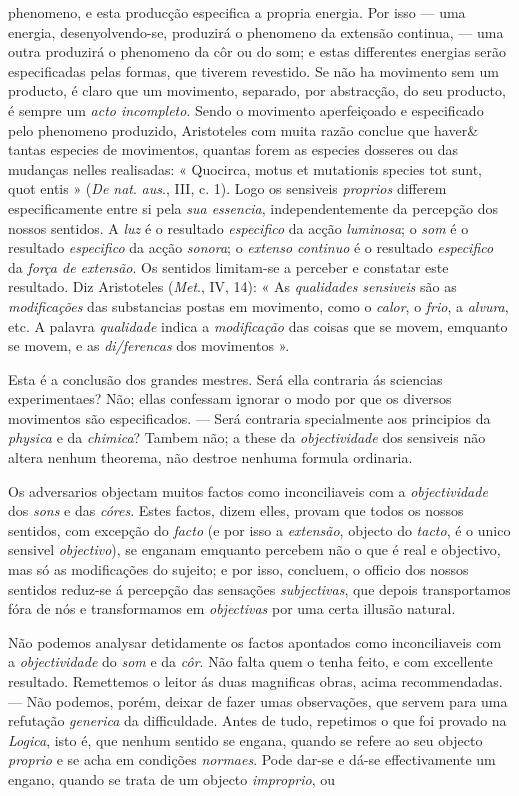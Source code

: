 phenomeno, e esta producção especifica a propria energia. Por isso --- uma energia, desenyolvendo-se, produzirá o phenomeno da extensão continua, --- uma outra produzirá o phenomeno da côr ou do som; e estas differentes energias serão especificadas pelas formas, que tiverem revestido. Se não ha movimento sem um producto, é claro que um movimento, separado, por abstracção, do seu producto, é sempre um \emph{acto incompleto}. Sendo o movimento aperfeiçoado e especificado pelo phenomeno produzido, Aristoteles com muita razão conclue que haver\& tantas especies de movimentos, quantas forem as especies dosseres ou das mudanças nelles realisadas: « Quocirca, motus et mutationis species tot sunt, quot entis » (\emph{De nat}. \emph{aus}., III, c. 1). Logo os sensiveis \emph{proprios} differem especificamente entre si pela \emph{sua essencia}, independentemente da percepção dos nossos sentidos. A \emph{luz} é o resultado \emph{especifico} da acção \emph{luminosa}; o \emph{som} é o resultado \emph{especifico} da acção \emph{sonora}; o \emph{extenso continuo} é o resultado \emph{especifico} da \emph{força de extensão}. Os sentidos limitam-se a perceber e constatar este resultado. Diz Aristoteles (\emph{Met}., IV, 14): « As \emph{qualidades sensiveis} são as \emph{modificações} das substancias postas em movimento, como o \emph{calor}, o \emph{frio}, a \emph{alvura}, etc. A palavra \emph{qualidade} indica a \emph{modificação} das coisas que se movem, emquanto se movem, e as \emph{di/ferencas} dos movimentos ».\par Esta é a conclusão dos grandes mestres. Será ella contraria ás sciencias experimentaes? Não; ellas confessam ignorar o modo por que os diversos movimentos são especificados. --- Será contraria specialmente aos principios da \emph{physica} e da \emph{chimica}? Tambem não; a these da \emph{objectividade} dos sensiveis não altera nenhum theorema, não destroe nenhuma formula ordinaria.\par Os adversarios objectam muitos factos como inconciliaveis com a \emph{objectividade} dos \emph{sons} e das \emph{córes}. Estes factos, dizem elles, provam que todos os nossos sentidos, com excepção do \emph{facto} (e por isso a \emph{extensão}, objecto do \emph{tacto}, é o unico sensivel \emph{objectivo}), se enganam emquanto percebem não o que é real e objectivo, mas só as modificações do sujeito; e por isso, concluem, o officio dos nossos sentidos reduz-se á percepção das sensações \emph{subjectivas}, que depois transportamos fóra de nós e transformamos em \emph{objectivas} por uma certa illusão natural.\par Não podemos analysar detidamente os factos apontados como inconciliaveis com a \emph{objectividade} do \emph{som} e da \emph{côr}. Não falta quem o tenha feito, e com excellente resultado. Remettemos o leitor ás duas magnificas obras, acima recommendadas. --- Não podemos, porém, deixar de fazer umas observações, que servem para uma refutação \emph{generica} da difficuldade. Antes de tudo, repetimos o que foi provado na \emph{Logica}, isto é, que nenhum sentido se engana, quando se refere ao seu objecto \emph{proprio} e se acha em condições \emph{normaes}. Pode dar-se e dá-se effectivamente um engano, quando se trata de um objecto \emph{improprio}, ou 